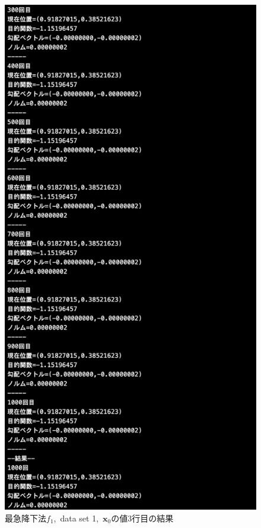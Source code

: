 \documentclass[12pt]{jarticle}
\begin{document}
\begin{figure}[h]
\begin{minipage}{0.5\hsize}
        \begin{center}
            \includegraphics[scale=0.2]{kadai1_1s_out1_3_3.png}
        \end{center}
    \end{minipage}
    \caption{最急降下法$f_1$,\ data set 1,\ $\boldsymbol{x}_0$の値3行目の結果}
\end{figure}
\end{document}
